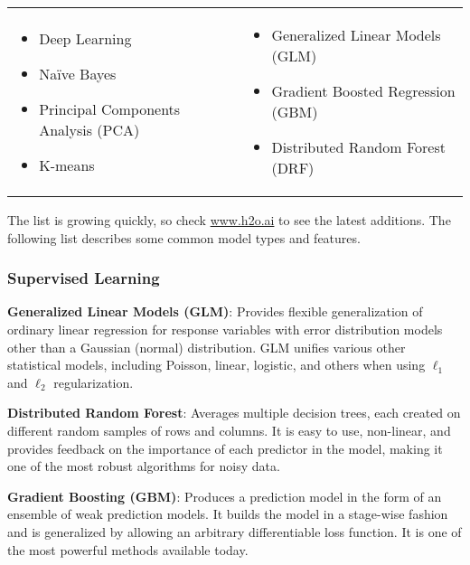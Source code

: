 {\begin{frame}%

\begin{tabular}{p{5.5cm}p{5.5cm}}

\begin{itemize}
  \item Deep Learning
  \item Na\"{i}ve Bayes
  \item Principal Components Analysis (PCA)
  \item K-means
\end{itemize} &

\begin{itemize}
  \item Generalized Linear Models (GLM) 
  \item Gradient Boosted Regression (GBM)
  \item Distributed Random Forest (DRF)
\end{itemize}

\end{tabular}

\end{frame}


The list is growing quickly, so check \url{www.h2o.ai} to see the latest additions. The following list describes some common model types and features. 

\subsubsection{Supervised Learning}
{\textbf{Generalized Linear Models (GLM)}}: Provides flexible generalization of ordinary linear regression for response variables with error distribution models other than a Gaussian (normal) distribution. GLM unifies various other statistical models, including Poisson, linear, logistic, and others when using $\ell_1$ and $\ell_2$ regularization.

{\textbf{Distributed Random Forest}}: Averages multiple decision trees, each created on different random samples of rows and columns. It is easy to use, non-linear, and provides feedback on the importance of each predictor in the model, making it one of the most robust algorithms for noisy data.

{\textbf{Gradient Boosting (GBM)}}: Produces a prediction model in the form of an ensemble of weak prediction models. It builds the model in a stage-wise fashion and is generalized by allowing an arbitrary differentiable loss function. It is one of the most powerful methods available today.

}
